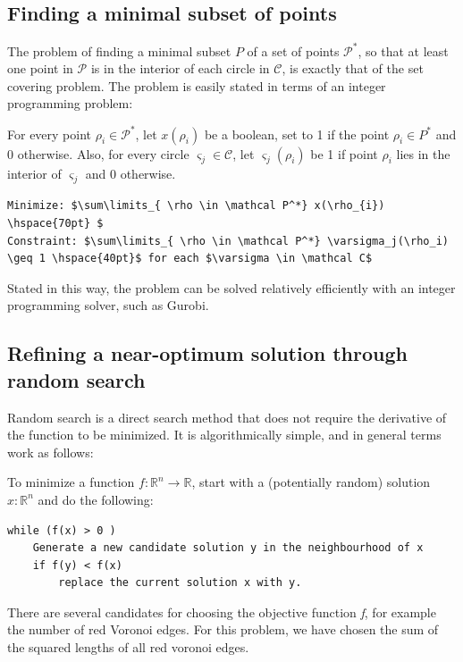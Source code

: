 \documentclass[a4paper,12pt]{article}
\begin{document}
\subsection{Finding a minimal subset of points}
\label{sec:gurobi}
The problem of finding a minimal subset $P$ of a set of points $\mathcal P^*$, so that at least one point in $\mathcal P$ is in the interior of each circle in $\mathcal C$, is exactly that of the set covering problem. The problem is easily stated in terms of an integer programming problem:

For every point $\rho_i \in \mathcal P^*$, let $x(\rho_i)$ be a boolean, set to 1 if the point $\rho_i \in P^*$  and 0 otherwise. Also, for every circle $\varsigma_j \in \mathcal C$, let $\varsigma_j (\rho_i)$ be 1 if point $\rho_i$ lies in the interior of $\varsigma_j$ and 0 otherwise.

\begin{lstlisting}[mathescape]
Minimize: $\sum\limits_{ \rho \in \mathcal P^*} x(\rho_{i}) \hspace{70pt} $
Constraint: $\sum\limits_{ \rho \in \mathcal P^*} \varsigma_j(\rho_i) \geq 1 \hspace{40pt}$ for each $\varsigma \in \mathcal C$
\end{lstlisting}

Stated in this way, the problem can be solved relatively efficiently with an integer programming solver, such as Gurobi.

\subsection{Refining a near-optimum solution through random search}
\label{sec:rand}
Random search is a direct search method that does not require the derivative of the function to be minimized. It is algorithmically simple, and in general terms work as follows:

To minimize a function $f : \mathds{R}^n \rightarrow \mathds{R}$, start with a (potentially random)  solution $x :  \mathds{R}^n$ and do the following:\newpage

\begin{lstlisting}[mathescape]
while (f(x) > 0 )
	Generate a new candidate solution y in the neighbourhood of x
	if f(y) < f(x)
		replace the current solution x with y.
\end{lstlisting}

There are several candidates for choosing the objective function \emph{f}, for example the number of red Voronoi edges. For this problem, we have chosen the sum of the squared lengths of all red voronoi edges.
\end{document}
